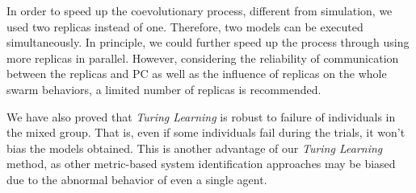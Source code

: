 In order to speed up the coevolutionary process, different from simulation, we used two replicas instead of one. Therefore, two models can be executed simultaneously. In principle, we could further speed up the process through using more replicas in parallel. However, considering the reliability of communication between the replicas and PC as well as the influence of replicas on the whole swarm behaviors, a limited number of replicas is recommended. 

We have also proved that \textit{Turing Learning} is robust to failure of individuals in the mixed group. That is, even if some individuals fail during the trials, it won't bias the models obtained. This is another advantage of our \textit{Turing Learning} method, as other metric-based system identification approaches may be biased due to the abnormal behavior of even a single agent.

